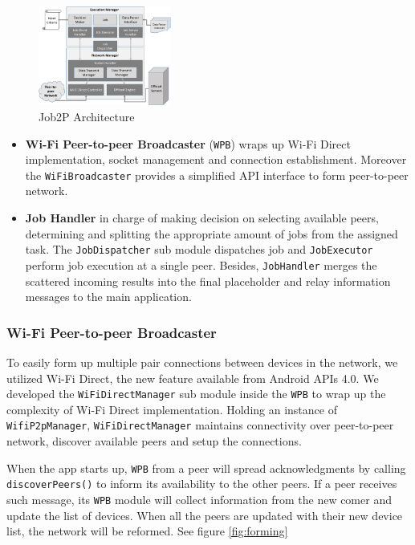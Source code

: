 \documentclass[conference]{IEEEtran}
\begin{document}
\begin{figure}[H]
\centerline {
\includegraphics[width=0.39\textwidth, natwidth=643, natheight=559]{data/jobShareArch}
}
\caption{Job2P Architecture}
\label{fig:architecture}
\end{figure}

\begin{itemize}
	\item \textbf{Wi-Fi Peer-to-peer Broadcaster} (\texttt{WPB}) wraps up Wi-Fi Direct implementation, socket management and connection establishment. Moreover the \texttt{WiFiBroadcaster} provides a simplified API interface to form peer-to-peer network.
	\item \textbf{Job Handler} in charge of making decision on selecting available peers, determining and splitting the appropriate amount of jobs from the assigned task. The \texttt{JobDispatcher} sub module dispatches job and \texttt{JobExecutor} perform job execution at a single peer. Besides, \texttt{JobHandler} merges the scattered incoming results into the final placeholder and relay information messages to the main application.
\end{itemize}

\subsubsection{Wi-Fi Peer-to-peer Broadcaster}
To easily form up multiple pair connections between devices in the network, we utilized Wi-Fi Direct, the new feature available from Android APIs 4.0. We developed the \texttt{WiFiDirectManager} sub module inside the \texttt{WPB} to wrap up the complexity of Wi-Fi Direct implementation. Holding an instance of \texttt{WifiP2pManager}, \texttt{WiFiDirectManager} maintains connectivity over peer-to-peer network, discover available peers and setup the connections. 

When the app starts up, \texttt{WPB} from a peer will spread acknowledgments by calling \texttt{discoverPeers()} to inform its availability to the other peers. If a peer receives such message, its \texttt{WPB} module will collect information from the new comer and update the list of devices. When all the peers are updated with their new device list, the network will be reformed. See figure \ref{fig:forming}
\end{document}
